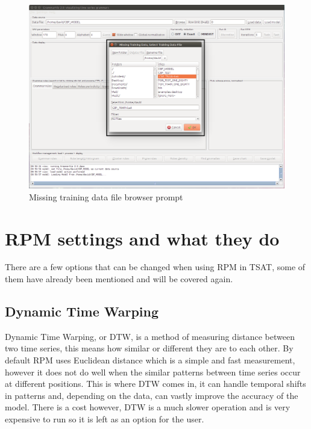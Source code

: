 \documentclass[letterpaper, 12pt]{article}
\begin{document}
\begin{figure}[H]
  \includegraphics[width=\textwidth]{TSAT-load-model-failed-data}
  \caption{Missing training data file browser prompt}
  \label{fig:TSAT-load-model-failed-data}
\end{figure}

\newpage
\section{RPM settings and what they do}
There are a few options that can be changed when using RPM in TSAT, some of them have already been mentioned and will be covered again.

\subsection{Dynamic Time Warping}
Dynamic Time Warping, or DTW, is a method of measuring distance between two time series, this means how similar or different they are to each other. By default RPM uses Euclidean distance which is a simple and fast measurement, however it does not do well when the similar patterns between time series occur at different positions. This is where DTW comes in, it can handle temporal shifts in patterns and, depending on the data, can vastly improve the accuracy of the model. There is a cost however, DTW is a much slower operation and is very expensive to run so it is left as an option for the user. 
\end{document}
